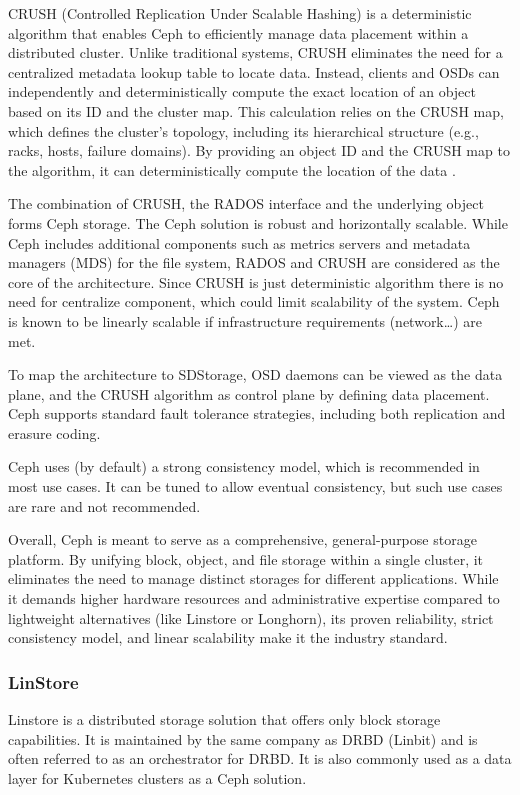 CRUSH (Controlled Replication Under Scalable Hashing) is a deterministic algorithm that enables Ceph to efficiently manage data placement within a distributed cluster. Unlike traditional systems, CRUSH eliminates the need for a centralized metadata lookup table to locate data. Instead, clients and OSDs can independently and deterministically compute the exact location of an object based on its ID and the cluster map. This calculation relies on the CRUSH map, which defines the cluster's topology, including its hierarchical structure (e.g., racks, hosts, failure domains). By providing an object ID and the CRUSH map to the algorithm, it can deterministically compute the location of the data \cite{vondra_storage_2022, gaurav_importance_2019}.

The combination of CRUSH, the RADOS interface and the underlying object forms Ceph storage. The Ceph solution is robust and horizontally scalable. While Ceph includes additional components such as metrics servers and metadata managers (MDS) for the file system, RADOS and CRUSH are considered as the core of the architecture. Since CRUSH is just deterministic algorithm there is no need for centralize component, which could limit scalability of the system. Ceph is known to be linearly scalable if infrastructure requirements (network\ldots) are met.

To map the architecture to SDStorage, OSD daemons can be viewed as the data plane, and the CRUSH algorithm as control plane by defining data placement. Ceph supports standard fault tolerance strategies, including both replication and erasure coding.

Ceph uses (by default) a strong consistency model, which is recommended in most use cases. It can be tuned to allow eventual consistency, but such use cases are rare and not recommended. \cite{ceph_authors_welcome_2016}

\vspace{1.5em}
Overall, Ceph is meant to serve as a comprehensive, general-purpose storage platform. By unifying block, object, and file storage within a single cluster, it eliminates the need to manage distinct storages for different applications. While it demands higher hardware resources and administrative expertise compared to lightweight alternatives (like Linstore or Longhorn), its proven reliability, strict consistency model, and linear scalability make it the industry standard.
\subsubsection{LinStore}\label{sec:linstore}
Linstore is a distributed storage solution that offers only block storage capabilities. It is maintained by the same company as DRBD (Linbit) and is often referred to as an orchestrator for DRBD. It is also commonly used as a data layer for Kubernetes clusters as a Ceph solution.

